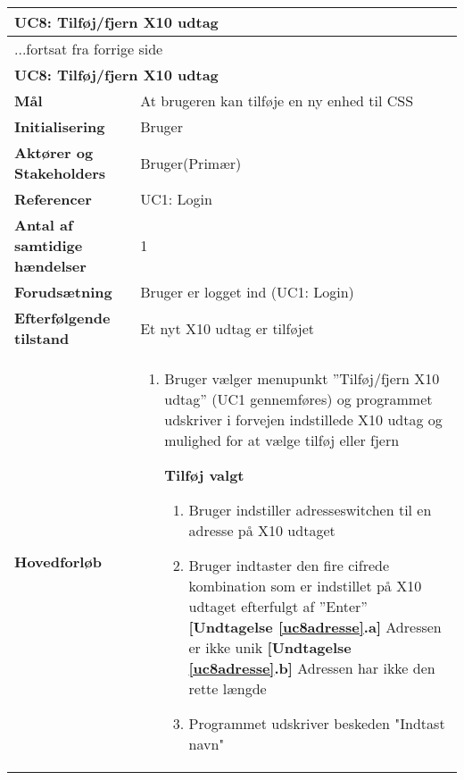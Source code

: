 \begin{center} \centering
	\begin{longtable}{|p{6cm}|p{8cm}|}
	\hline
		\multicolumn{2}{|l|}{\textbf{UC8: Tilføj/fjern X10 udtag}} \\\hline
		\endfirsthead
		
		\multicolumn{2}{l}{...fortsat fra forrige side} \\ \hline 
		\multicolumn{2}{|l|}{\textbf{UC8: Tilføj/fjern X10 udtag}} \\\hline
		\endhead		
		
		\textbf{Mål}							&At brugeren kan tilføje en ny enhed til CSS	\\\hline
		\textbf{Initialisering}				&Bruger					 					\\\hline
		\textbf{Aktører og Stakeholders}		&Bruger(Primær)								\\\hline
		\textbf{Referencer}					&UC1: Login									\\\hline
		\textbf{Antal af samtidige hændelser}&1 											\\\hline
		\textbf{Forudsætning}				&Bruger er logget ind (UC1: Login)			\\\hline
		\textbf{Efterfølgende tilstand}		&Et nyt X10 udtag er tilføjet 				\\\hline
		\textbf{Hovedforløb}					
			&\begin{enumerate}
				
		\item Bruger vælger menupunkt ''Tilføj/fjern X10 udtag'' (UC1 gennemføres) og programmet udskriver i forvejen indstillede X10 udtag og mulighed for at vælge tilføj eller fjern
					
				\subitem \textbf{Tilføj valgt}			
				\begin{enumerate}
				\item \label{uc8indstilAdresse} Bruger indstiller adresseswitchen til en adresse på X10 udtaget

				\item \label{uc8adresse} Bruger indtaster den fire cifrede kombination som er indstillet på X10 udtaget efterfulgt af ''Enter''\newline
						\textbf{[Undtagelse \ref{uc8adresse}.a]} Adressen er ikke unik\newline
						\textbf{[Undtagelse \ref{uc8adresse}.b]} Adressen har ikke den rette længde
				
					\item \label{uc8indstilNavn} Programmet udskriver beskeden "Indtast navn"
				

\end{enumerate}
\end{enumerate}
\end{longtable}
\end{center}
